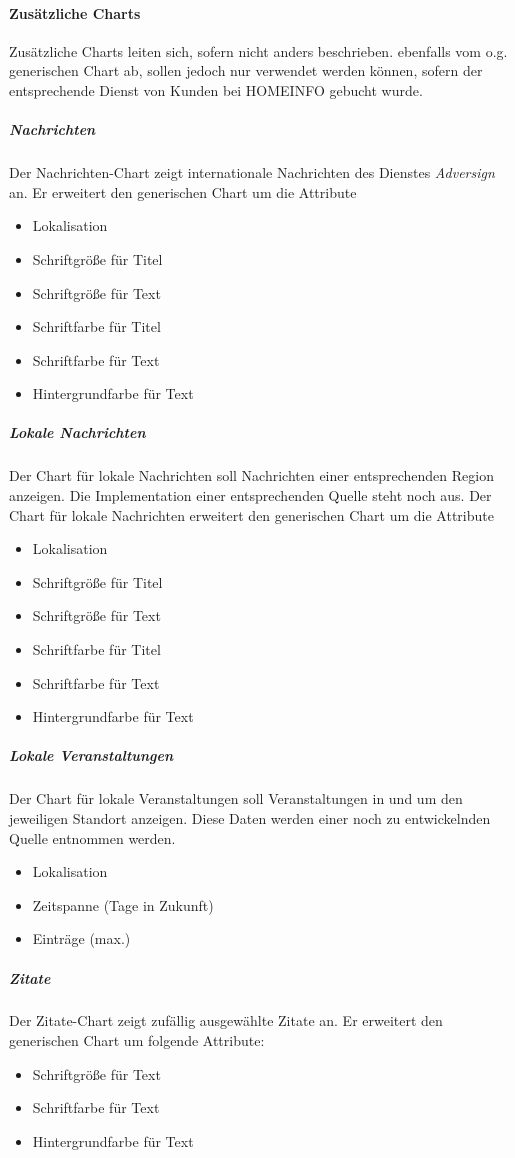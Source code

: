 \documentclass[a4paper]{article}
\begin{document}
	\paragraph{Zusätzliche Charts}
	Zusätzliche Charts leiten sich, sofern nicht anders beschrieben. ebenfalls vom o.g. generischen Chart ab, sollen jedoch nur verwendet werden können, sofern der entsprechende Dienst von Kunden bei HOMEINFO gebucht wurde.
	\subparagraph{Nachrichten}
	Der Nachrichten-Chart zeigt internationale Nachrichten des Dienstes \emph{Adversign} an. Er erweitert den generischen Chart um die Attribute
	\begin{itemize}
	\item Lokalisation
	\item Schriftgröße für Titel
	\item Schriftgröße für Text
	\item Schriftfarbe für Titel
	\item Schriftfarbe für Text
	\item Hintergrundfarbe für Text
	\end{itemize}
	\subparagraph{Lokale Nachrichten}
	Der Chart für lokale Nachrichten soll Nachrichten einer entsprechenden Region anzeigen. Die Implementation einer entsprechenden Quelle steht noch aus. Der Chart für lokale Nachrichten erweitert den generischen Chart um die Attribute
	\begin{itemize}
	\item Lokalisation
	\item Schriftgröße für Titel
	\item Schriftgröße für Text
	\item Schriftfarbe für Titel
	\item Schriftfarbe für Text
	\item Hintergrundfarbe für Text
	\end{itemize}
	\pagebreak
	\subparagraph{Lokale Veranstaltungen}
	Der Chart für lokale Veranstaltungen soll Veranstaltungen in und um den jeweiligen Standort anzeigen. Diese Daten werden einer noch zu entwickelnden Quelle entnommen werden.
	\begin{itemize}
	\item Lokalisation
	\item Zeitspanne (Tage in Zukunft)
	\item Einträge (max.)
	\end{itemize}
	\subparagraph{Zitate}
	Der Zitate-Chart zeigt zufällig ausgewählte Zitate an. Er erweitert den generischen Chart um folgende Attribute:
	\begin{itemize}
	\item Schriftgröße für Text
	\item Schriftfarbe für Text
	\item Hintergrundfarbe für Text
	\end{itemize}
\end{document}

